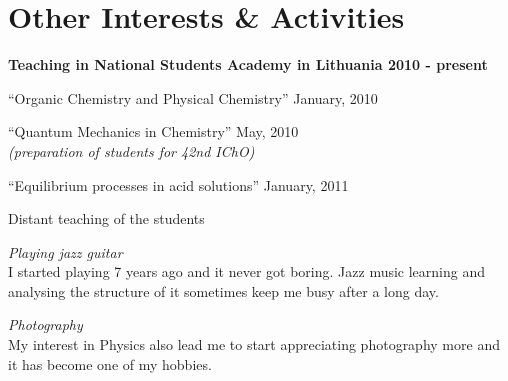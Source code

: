 \section{Other Interests \& Activities}

\textbf{Teaching in National Students Academy in Lithuania
\hfill 2010 - present}
\begin{innerlist}
  \item ``Organic Chemistry and Physical Chemistry''
    \hfill January, 2010 
  \item ``Quantum Mechanics in Chemistry'' 
    \hfill May, 2010 \\
    {\em (preparation of students for 42nd IChO)}
  \item ``Equilibrium processes in acid solutions''
    \hfill January, 2011
  \item Distant teaching of the students
\end{innerlist}
\begin{outerlist}
  \item[] \emph{Playing jazz guitar}\\
    I started playing 7 years ago and it never got boring. Jazz music learning
    and analysing the structure of it sometimes keep me busy after a long day.
  \item[] \emph{Photography}\\
    My interest in Physics also lead me to start appreciating
    photography more and it has become one of my hobbies.
\end{outerlist}


